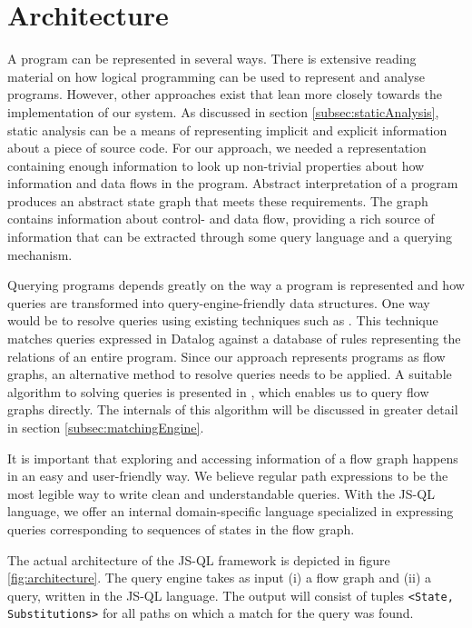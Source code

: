 \section{Architecture}
\label{sec:Architecture}
A program can be represented in several ways. There is extensive reading material on how logical programming can be used to represent and analyse programs\cite{Reps1995}\cite{DatalogDBQueries}. However, other approaches exist that lean more closely towards the implementation of our system.  As discussed in section \ref{subsec:staticAnalysis}, static analysis can be a means of representing implicit and explicit information about a piece of source code. For our approach, we needed a representation containing enough information to look up non-trivial properties about how information and data flows in the program. Abstract interpretation of a program produces an abstract state graph that meets these requirements. The graph contains information about control- and data flow, providing a rich source of information that can be extracted through some query language and a querying mechanism. 

Querying programs depends greatly on the way a program is represented and how queries are transformed into query-engine-friendly data structures. One way would be to resolve queries using existing techniques such as \cite{bddbddb}. This technique matches queries expressed in Datalog against a database of rules representing the relations of an entire program. Since our approach represents programs as flow graphs, an alternative method to resolve queries needs to be applied. A suitable algorithm to solving queries is presented in \cite{algoEngine}, which enables us to query flow graphs directly. The internals of this algorithm will be discussed in greater detail in section \ref{subsec:matchingEngine}.

It is important that exploring and accessing information of a flow graph happens in an easy and user-friendly way. We believe regular path expressions to be the most legible way to write clean and understandable queries. With the JS-QL language, we offer an internal domain-specific language specialized in expressing queries corresponding to sequences of states in the flow graph. 

The actual architecture of the JS-QL framework is depicted in figure \ref{fig:architecture}. The query engine takes as input (i) a flow graph and (ii) a query, written in the JS-QL language. The output will consist of tuples \texttt{<State, Substitutions>} for all paths on which a match for the query was found.

